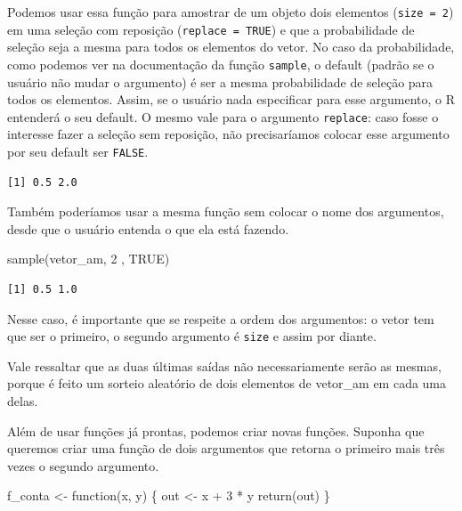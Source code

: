 \documentclass[
  letterpaper,
  DIV=11,
  numbers=noendperiod]{scrreprt}
\newenvironment{Shaded}{\begin{snugshade}}{\end{snugshade}}
\newcommand{\ConstantTok}[1]{\textcolor[rgb]{0.56,0.35,0.01}{#1}}
\newcommand{\ControlFlowTok}[1]{\textcolor[rgb]{0.00,0.23,0.31}{#1}}
\newcommand{\DecValTok}[1]{\textcolor[rgb]{0.68,0.00,0.00}{#1}}
\newcommand{\FunctionTok}[1]{\textcolor[rgb]{0.28,0.35,0.67}{#1}}
\newcommand{\NormalTok}[1]{\textcolor[rgb]{0.00,0.23,0.31}{#1}}
\newcommand{\OtherTok}[1]{\textcolor[rgb]{0.00,0.23,0.31}{#1}}
\newcommand{\SpecialCharTok}[1]{\textcolor[rgb]{0.37,0.37,0.37}{#1}}
\begin{document}
Podemos usar essa função para amostrar de um objeto dois elementos
(\texttt{size\ =\ 2}) em uma seleção com reposição
(\texttt{replace\ =\ TRUE}) e que a probabilidade de seleção seja a
mesma para todos os elementos do vetor. No caso da probabilidade, como
podemos ver na documentação da função \texttt{sample}, o default (padrão
se o usuário não mudar o argumento) é ser a mesma probabilidade de
seleção para todos os elementos. Assim, se o usuário nada especificar
para esse argumento, o R entenderá o seu default. O mesmo vale para o
argumento \texttt{replace}: caso fosse o interesse fazer a seleção sem
reposição, não precisaríamos colocar esse argumento por seu default ser
\texttt{FALSE}.

\begin{verbatim}
[1] 0.5 2.0
\end{verbatim}

Também poderíamos usar a mesma função sem colocar o nome dos argumentos,
desde que o usuário entenda o que ela está fazendo.

\begin{Shaded}
\begin{Highlighting}[]
\FunctionTok{sample}\NormalTok{(vetor\_am, }\DecValTok{2}\NormalTok{ , }\ConstantTok{TRUE}\NormalTok{) }
\end{Highlighting}
\end{Shaded}

\begin{verbatim}
[1] 0.5 1.0
\end{verbatim}

Nesse caso, é importante que se respeite a ordem dos argumentos: o vetor
tem que ser o primeiro, o segundo argumento é \texttt{size} e assim por
diante.

Vale ressaltar que as duas últimas saídas não necessariamente serão as
mesmas, porque é feito um sorteio aleatório de dois elementos de
vetor\_am em cada uma delas.

Além de usar funções já prontas, podemos criar novas funções. Suponha
que queremos criar uma função de dois argumentos que retorna o primeiro
mais três vezes o segundo argumento.

\begin{Shaded}
\begin{Highlighting}[]
\NormalTok{f\_conta }\OtherTok{\textless{}{-}} \ControlFlowTok{function}\NormalTok{(x, y) \{}
\NormalTok{  out }\OtherTok{\textless{}{-}}\NormalTok{ x }\SpecialCharTok{+} \DecValTok{3} \SpecialCharTok{*}\NormalTok{ y}
  \FunctionTok{return}\NormalTok{(out)}
\NormalTok{\}}
\end{Highlighting}
\end{Shaded}
\end{document}
